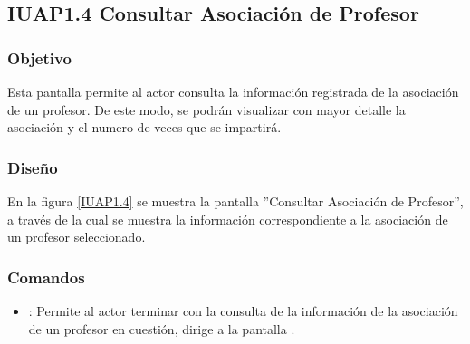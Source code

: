 \subsection{IUAP1.4 Consultar Asociación de Profesor}

\subsubsection{Objetivo}
	Esta pantalla permite al actor consulta la información registrada de la asociación de un profesor. De este modo, se podrán visualizar con mayor detalle la asociación y el numero de veces que se impartirá.
	
\subsubsection{Diseño}
	En la figura \ref{IUAP1.4} se muestra la pantalla ''Consultar Asociación de Profesor'', a través de la cual se muestra la información correspondiente a la asociación de un profesor seleccionado. 


\subsubsection{Comandos}
\begin{itemize}
	\item {}: Permite al actor terminar con la consulta de la información de la asociación de un profesor en cuestión, dirige a la pantalla .
\end{itemize}
